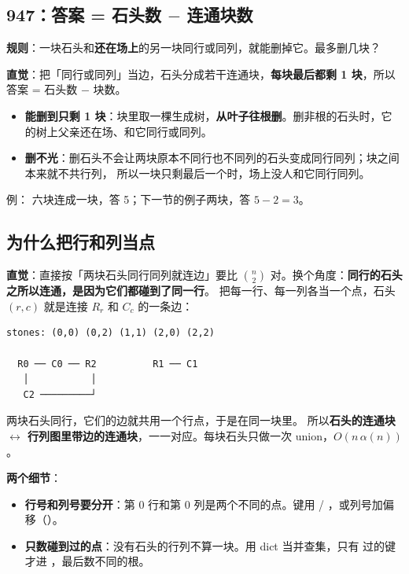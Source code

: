 \subsection{\texorpdfstring{947：答案 = 石头数 $-$ 连通块数}{947：答案 = 石头数 − 连通块数}}

\textbf{规则}：一块石头和\textbf{还在场上}的另一块同行或同列，就能删掉它。最多删几块？

\textbf{直觉}：把「同行或同列」当边，石头分成若干连通块，\textbf{每块最后都剩 1 块}，所以答案 = 石头数 $-$ 块数。

\begin{itemize}
\item \textbf{能删到只剩 1 块}：块里取一棵生成树，\textbf{从叶子往根删}。删非根的石头时，它的树上父亲还在场、和它同行或同列。
\item \textbf{删不光}：删石头不会让两块原本不同行也不同列的石头变成同行同列；块之间本来就不共行列，
所以一块只剩最后一个时，场上没人和它同行同列。
\end{itemize}

例：\code{[[0,0],[0,1],[1,0],[1,2],[2,1],[2,2]]} 六块连成一块，答 5；下一节的例子两块，答 $5 - 2 = 3$。

\subsection{为什么把行和列当点}

\textbf{直觉}：直接按「两块石头同行同列就连边」要比 $\binom{n}{2}$ 对。换个角度：\textbf{同行的石头之所以连通，是因为它们都碰到了同一行}。
把每一行、每一列各当一个点，石头 $(r, c)$ 就是连接 $R_r$ 和 $C_c$ 的一条边：

\begin{center}
\begin{minipage}{0.4\linewidth}
\begin{Verbatim}[fontsize=\small]
stones: (0,0) (0,2) (1,1) (2,0) (2,2)

  R0 ── C0 ── R2          R1 ── C1
   │           │
   C2 ─────────┘
\end{Verbatim}
\end{minipage}\hfill
\begin{minipage}{0.48\linewidth}
两块石头同行，它们的边就共用一个行点，于是在同一块里。
所以\textbf{石头的连通块 $\leftrightarrow$ 行列图里带边的连通块}，一一对应。每块石头只做一次 union，$O(n\,\alpha(n))$。
\end{minipage}
\end{center}

\textbf{两个细节}：
\begin{itemize}
\item \textbf{行号和列号要分开}：第 0 行和第 0 列是两个不同的点。键用  / ，或列号加偏移（）。
\item \textbf{只数碰到过的点}：没有石头的行列不算一块。用 dict 当并查集，只有  过的键才进 ，最后数不同的根。
\end{itemize}

